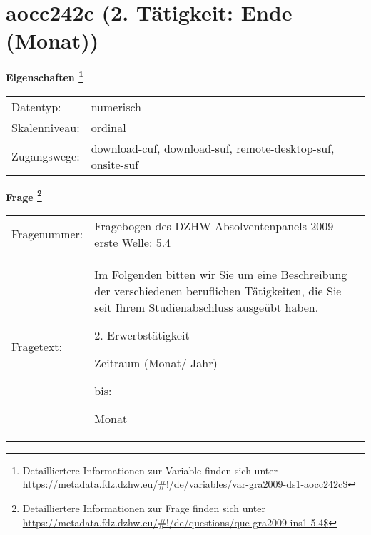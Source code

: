 
    \setcounter{footnote}{0}

    \vspace*{-1.8cm}
	\section{aocc242c (2. Tätigkeit: Ende (Monat))}
	\label{section:aocc242c}



    \vspace*{0.5cm}
    \noindent\textbf{Eigenschaften
	\footnote{Detailliertere Informationen zur Variable finden sich unter
		\url{https://metadata.fdz.dzhw.eu/\#!/de/variables/var-gra2009-ds1-aocc242c$}}}\\
	\begin{tabularx}{\hsize}{@{}lX}
	Datentyp: & numerisch \\
	Skalenniveau: & ordinal \\
	Zugangswege: &
	  download-cuf, 
	  download-suf, 
	  remote-desktop-suf, 
	  onsite-suf
 \\
    \end{tabularx}



				\vspace*{0.5cm}
                \noindent\textbf{Frage
	                \footnote{Detailliertere Informationen zur Frage finden sich unter
		              \url{https://metadata.fdz.dzhw.eu/\#!/de/questions/que-gra2009-ins1-5.4$}}}\\
				\begin{tabularx}{\hsize}{@{}lX}
					Fragenummer: &
					  Fragebogen des DZHW-Absolventenpanels 2009 - erste Welle:
					  5.4
 \\
					Fragetext: & Im Folgenden bitten wir Sie um eine Beschreibung der verschiedenen beruflichen Tätigkeiten, die Sie seit Ihrem Studienabschluss ausgeübt haben.\par  2. Erwerbstätigkeit\par  Zeitraum (Monat/ Jahr)\par  bis:\par  Monat \\
				\end{tabularx}





